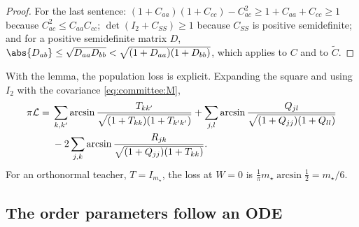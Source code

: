 \begin{refsection}
\begin{proof}
For the last sentence: $(1+C_{aa})(1+C_{cc})-C_{ac}^2\ge1+C_{aa}+C_{cc}\ge1$ because $C_{ac}^2\le C_{aa}C_{cc}$; $\det(I_2+C_{SS})\ge1$ because $C_{SS}$ is positive semidefinite; and for a positive semidefinite matrix $D$, $\abs{D_{ab}}\le\sqrt{D_{aa}D_{bb}}<\sqrt{(1+D_{aa})(1+D_{bb})}$, which applies to $C$ and to $\tilde C$.
\end{proof}

With the lemma, the population loss is explicit. Expanding the square and using $I_2$ with the covariance \eqref{eq:committee:M},
\begin{equation}\label{eq:committee:loss}
\begin{aligned}
  \pi\mathcal{L}={}&\sum_{k,k'}\arcsin\frac{T_{kk'}}{\sqrt{(1+T_{kk})(1+T_{k'k'})}}+\sum_{j,l}\arcsin\frac{Q_{jl}}{\sqrt{(1+Q_{jj})(1+Q_{ll})}}\\
  &-2\sum_{j,k}\arcsin\frac{R_{jk}}{\sqrt{(1+Q_{jj})(1+T_{kk})}}.
\end{aligned}
\end{equation}
For an orthonormal teacher, $T=I_{m_\star}$, the loss at $W=0$ is $\frac1\pi m_\star\arcsin\frac12=m_\star/6$.

\subsection{The order parameters follow an ODE}\label{sec:committee:odelimit}


\end{refsection}

